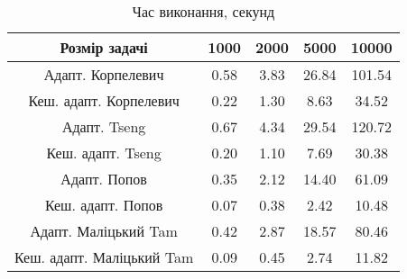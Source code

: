 \begin{table}[H]
	\centering
	\begin{tabular}{|c||c|c|c|c|}\hline
		Розмір задачі & 1000 & 2000 & 5000 & 10000 \\ \hline \hline
		Адапт. Корпелевич & 0.58 & 3.83 & 26.84 & 101.54 \\ \hline
		Кеш. адапт. Корпелевич & 0.22 & 1.30 & 8.63 & 34.52 \\ \hline
		Адапт. Tseng & 0.67 & 4.34 & 29.54 & 120.72 \\ \hline
		Кеш. адапт. Tseng & 0.20 & 1.10 & 7.69 & 30.38 \\ \hline
		Адапт. Попов & 0.35 & 2.12 & 14.40 & 61.09 \\ \hline
		Кеш. адапт. Попов & 0.07 & 0.38 & 2.42 & 10.48 \\ \hline
		Адапт. Маліцький Tam & 0.42 & 2.87 & 18.57 & 80.46 \\ \hline
		Кеш. адапт. Маліцький Tam & 0.09 & 0.45 & 2.74 & 11.82 \\ \hline
	\end{tabular}
	\caption{Час виконання, секунд}
\end{table}
